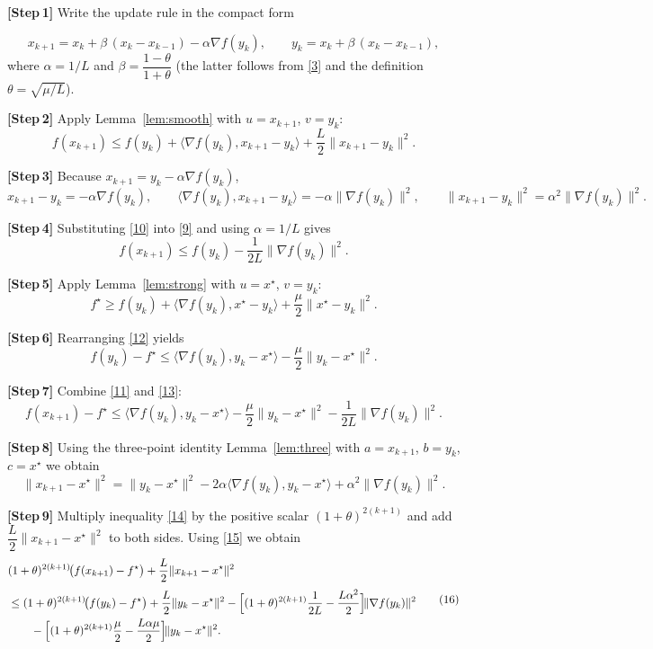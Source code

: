 \documentclass{article}
\begin{document}
\bigskip
\noindent\textbf{[Step 1]}  Write the update rule in the compact form  

\[
x_{k+1}=x_{k}+ \beta\,(x_{k}-x_{k-1})-\alpha\nabla f(y_{k}),
\qquad
y_{k}=x_{k}+ \beta\,(x_{k}-x_{k-1}),
\tag{8}
\]
where $\alpha=1/L$ and $\beta=\dfrac{1-\theta}{1+\theta}$ (the latter follows from
\eqref{3} and the definition $\theta=\sqrt{\mu/L}$).

\noindent\textbf{[Step 2]}  Apply Lemma~\ref{lem:smooth} with $u=x_{k+1}$,
$v=y_{k}$:
\[
f(x_{k+1})\le f(y_{k})+\langle\nabla f(y_{k}),x_{k+1}-y_{k}\rangle
            +\frac{L}{2}\|x_{k+1}-y_{k}\|^{2}.
\tag{9}
\]

\noindent\textbf{[Step 3]}  Because $x_{k+1}=y_{k}-\alpha\nabla f(y_{k})$,
\[
x_{k+1}-y_{k}=-\alpha\nabla f(y_{k}),\qquad
\langle\nabla f(y_{k}),x_{k+1}-y_{k}\rangle=-\alpha\|\nabla f(y_{k})\|^{2},
\qquad
\|x_{k+1}-y_{k}\|^{2}= \alpha^{2}\|\nabla f(y_{k})\|^{2}.
\tag{10}
\]

\noindent\textbf{[Step 4]}  Substituting \eqref{10} into \eqref{9} and using
$\alpha=1/L$ gives
\[
f(x_{k+1})\le f(y_{k})-\frac{1}{2L}\|\nabla f(y_{k})\|^{2}.
\tag{11}
\]

\noindent\textbf{[Step 5]}  Apply Lemma~\ref{lem:strong} with $u=x^{\star}$,
$v=y_{k}$:
\[
f^{\star}\ge f(y_{k})+\langle\nabla f(y_{k}),x^{\star}-y_{k}\rangle
            +\frac{\mu}{2}\|x^{\star}-y_{k}\|^{2}.
\tag{12}
\]

\noindent\textbf{[Step 6]}  Rearranging \eqref{12} yields
\[
f(y_{k})-f^{\star}\le
\langle\nabla f(y_{k}),y_{k}-x^{\star}\rangle
-\frac{\mu}{2}\|y_{k}-x^{\star}\|^{2}.
\tag{13}
\]

\noindent\textbf{[Step 7]}  Combine \eqref{11} and \eqref{13}:
\[
f(x_{k+1})-f^{\star}\le
\langle\nabla f(y_{k}),y_{k}-x^{\star}\rangle
-\frac{\mu}{2}\|y_{k}-x^{\star}\|^{2}
-\frac{1}{2L}\|\nabla f(y_{k})\|^{2}.
\tag{14}
\]

\noindent\textbf{[Step 8]}  Using the three‑point identity Lemma~\ref{lem:three}
with $a=x_{k+1}$, $b=y_{k}$, $c=x^{\star}$ we obtain
\[
\|x_{k+1}-x^{\star}\|^{2}
= \|y_{k}-x^{\star}\|^{2}
   -2\alpha\langle\nabla f(y_{k}),y_{k}-x^{\star}\rangle
   +\alpha^{2}\|\nabla f(y_{k})\|^{2}.
\tag{15}
\]

\noindent\textbf{[Step 9]}  Multiply inequality \eqref{14} by the positive scalar
$(1+\theta)^{2(k+1)}$ and add $\dfrac{L}{2}\|x_{k+1}-x^{\star}\|^{2}$ to both
sides.  Using \eqref{15} we obtain
\[
\begin{aligned}
&(1+\theta)^{2(k+1)}\!\bigl(f(x_{k+1})-f^{\star}\bigr)
   +\frac{L}{2}\|x_{k+1}-x^{\star}\|^{2}\\[1mm]
&\le (1+\theta)^{2(k+1)}\!\bigl(f(y_{k})-f^{\star}\bigr)
   +\frac{L}{2}\|y_{k}-x^{\star}\|^{2}
   -\Bigl[(1+\theta)^{2(k+1)}\frac{1}{2L}
          -\frac{L\alpha^{2}}{2}\Bigr]\!\|\nabla f(y_{k})\|^{2}\\
&\qquad
   -\Bigl[(1+\theta)^{2(k+1)}\frac{\mu}{2}
          -\frac{L\alpha\mu}{2}\Bigr]\!\|y_{k}-x^{\star}\|^{2}.
\end{aligned}
\tag{16}
\]
\end{document}
